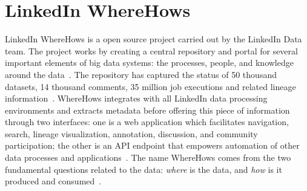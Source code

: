 \section{LinkedIn WhereHows}

LinkedIn WhereHows is a open source project carried out by the
LinkedIn Data team. The project works by creating a central repository
and portal for several important elements of big data systems: the
processes, people, and knowledge around the
data~\cite{hid-sp18-405-www-wherehows}. The repository has captured
the status of 50 thousand datasets, 14 thousand comments, 35 million
job executions and related lineage
information~\cite{hid-sp18-405-www-wherehows}. WhereHows integrates
with all LinkedIn data processing environments and extracts metadata
before offering this piece of information through two interfaces: one
is a web application which facilitates navigation, search, lineage
visualization, annotation, discussion, and community participation;
the other is an API endpoint that empowers automation of other data
processes and applications~\cite{hid-sp18-405-www-wherehows}. The name
WhereHows comes from the two fundamental questions related to the
data: \textit{where} is the data, and \textit{how} is it produced and
consumed~\cite{hid-sp18-405-githubwiki-wherehows}.
